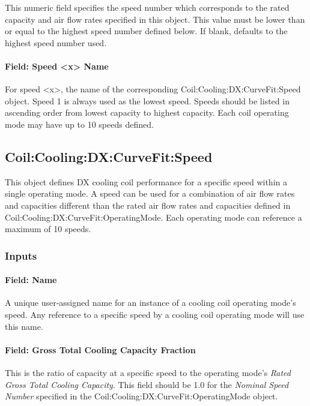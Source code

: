 This numeric field specifies the speed number which corresponds to the rated capacity and air flow rates specified in this object. This value must be lower than or equal to the highest speed number defined below. If blank, defaults to the highest speed number used.

\paragraph{Field: Speed \textless{}x\textgreater{} Name}\label{field-speed-x-name}

For speed \textless{}x\textgreater{}, the name of the corresponding Coil:Cooling:DX:CurveFit:Speed object. Speed 1 is always used as the lowest speed. Speeds should be listed in ascending order from lowest capacity to highest capacity. Each coil operating mode may have up to 10 speeds defined.

\subsection{Coil:Cooling:DX:CurveFit:Speed}\label{coilcoolingdxcurvefitspeed}

This object defines DX cooling coil performance for a specific speed within a single operating mode. A speed can be used for a combination of air flow rates and capacities different than the rated air flow rates and capacities defined in Coil:Cooling:DX:CurveFit:OperatingMode. Each operating mode can reference a maximum of 10 speeds.

\subsubsection{Inputs}\label{inputs-04}

\paragraph{Field: Name}\label{field-name-04}

A unique user-assigned name for an instance of a cooling coil operating mode's speed. Any reference to a specific speed by a cooling coil operating mode will use this name.

\paragraph{Field: Gross Total Cooling Capacity Fraction}\label{field-gross-total-cooling-capacity-fraction}

This is the ratio of capacity at a specific speed to the operating mode's \textit{Rated Gross Total Cooling Capacity}. This field should be 1.0 for the \textit{Nominal Speed Number} specified in the Coil:Cooling:DX:CurveFit:OperatingMode object.

